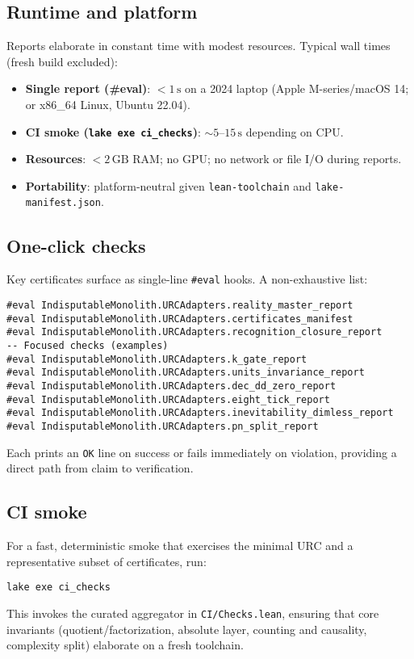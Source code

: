 \documentclass[11pt,a4paper,twoside]{article}
\numberwithin{equation}{section}
\theoremstyle{customthm}
\theoremstyle{customdef}
\theoremstyle{customrem}
\begin{document}
\subsection{Runtime and platform}\label{subsec:repro-runtime}
Reports elaborate in constant time with modest resources. Typical wall times (fresh build excluded):
\begin{itemize}[leftmargin=*]
  \item \textbf{Single report (\#eval)}: \(<1\,\mathrm{s}\) on a 2024 laptop (Apple M-series/macOS 14; or x86\_64 Linux, Ubuntu 22.04).
  \item \textbf{CI smoke (\texttt{lake exe ci\_checks})}: \(\sim 5\text{--}15\,\mathrm{s}\) depending on CPU.
  \item \textbf{Resources}: \(<2\,\mathrm{GB}\) RAM; no GPU; no network or file I/O during reports.
  \item \textbf{Portability}: platform-neutral given \texttt{lean-toolchain} and \texttt{lake-manifest.json}.
\end{itemize}

\subsection{One-click checks}\label{subsec:repro-oneclick}

Key certificates surface as single-line \texttt{\#eval} hooks. A non-exhaustive list:
\begin{lstlisting}
#eval IndisputableMonolith.URCAdapters.reality_master_report
#eval IndisputableMonolith.URCAdapters.certificates_manifest
#eval IndisputableMonolith.URCAdapters.recognition_closure_report
-- Focused checks (examples)
#eval IndisputableMonolith.URCAdapters.k_gate_report
#eval IndisputableMonolith.URCAdapters.units_invariance_report
#eval IndisputableMonolith.URCAdapters.dec_dd_zero_report
#eval IndisputableMonolith.URCAdapters.eight_tick_report
#eval IndisputableMonolith.URCAdapters.inevitability_dimless_report
#eval IndisputableMonolith.URCAdapters.pn_split_report
\end{lstlisting}

Each prints an \texttt{OK} line on success or fails immediately on violation, providing a direct path from claim to verification.

\subsection{CI smoke}\label{subsec:repro-ci}

For a fast, deterministic smoke that exercises the minimal URC and a representative subset of certificates, run:
\begin{lstlisting}
lake exe ci_checks
\end{lstlisting}
This invokes the curated aggregator in \texttt{CI/Checks.lean}, ensuring that core invariants (quotient/factorization, absolute layer, counting and causality, complexity split) elaborate on a fresh toolchain.
\end{document}
